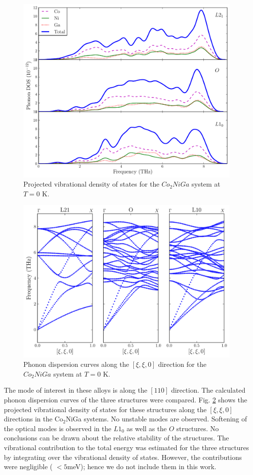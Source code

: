 \documentclass[%
preprint,
 amsmath,amssymb,
 aps,
prb,
showkeys,
]{revtex4-1}
\begin{document}
\begin{figure}[htp!]
  \includegraphics[scale=0.7]{figure_6}
  \caption{Projected vibrational density of states for the $Co_2NiGa$ system at $T=0$ K.}
  \label{CNG_pvdos}
\end{figure}

\begin{figure}
  \includegraphics[scale=0.7]{figure_7}
  \caption{Phonon dispersion curves  along the $[\xi,\xi,0] $ direction for the $Co_2NiGa$ system at $T=0$ K. }
  \label{CNG_dispersion}
\end{figure}

The mode of interest in these alloys is along the $[110]$ direction. The calculated phonon dispersion curves of the three structures were compared. Fig. \ref{CNG_dispersion}  shows the projected vibrational density of states for these structures along the $[\xi,\xi,0] $ directions in the Co$_2$NiGa  systems. No unstable modes are observed. Softening of the optical modes is observed in the $L1_0$ as well as the $O$ structures. No conclusions can be drawn about the relative stability of the structures. The vibrational contribution to the total energy was estimated for the three structures by integrating over the vibrational density of states. However, the contributions were negligible ( $< 5 $meV); hence we do not include them in this work.
\end{document}

